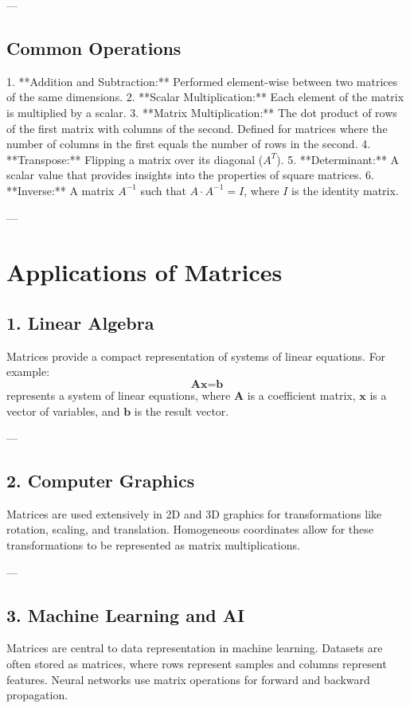 ---

\subsection*{Common Operations}
1. **Addition and Subtraction:** Performed element-wise between two matrices of the same dimensions.
2. **Scalar Multiplication:** Each element of the matrix is multiplied by a scalar.
3. **Matrix Multiplication:** The dot product of rows of the first matrix with columns of the second. Defined for matrices where the number of columns in the first equals the number of rows in the second.
4. **Transpose:** Flipping a matrix over its diagonal (\(A^T\)).
5. **Determinant:** A scalar value that provides insights into the properties of square matrices.
6. **Inverse:** A matrix \(A^{-1}\) such that \(A \cdot A^{-1} = I\), where \(I\) is the identity matrix.

---

\section*{Applications of Matrices}

\subsection*{1. Linear Algebra}
Matrices provide a compact representation of systems of linear equations. For example:
\[
\textbf{Ax} = \textbf{b}
\]
represents a system of linear equations, where \(\textbf{A}\) is a coefficient matrix, \(\textbf{x}\) is a vector of variables, and \(\textbf{b}\) is the result vector.

---

\subsection*{2. Computer Graphics}
Matrices are used extensively in 2D and 3D graphics for transformations like rotation, scaling, and translation. Homogeneous coordinates allow for these transformations to be represented as matrix multiplications.

---

\subsection*{3. Machine Learning and AI}
Matrices are central to data representation in machine learning. Datasets are often stored as matrices, where rows represent samples and columns represent features. Neural networks use matrix operations for forward and backward propagation.

